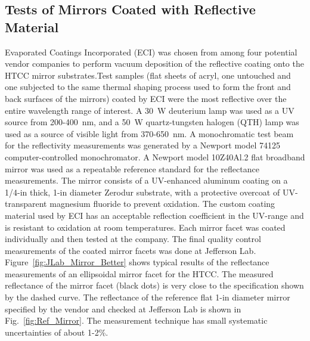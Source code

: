 \subsection{Tests of Mirrors Coated with Reflective Material}

Evaporated Coatings Incorporated (ECI) was chosen from among four potential vendor companies to perform
vacuum deposition of the reflective coating onto the HTCC mirror substrates.Test samples (flat sheets of acryl,
one untouched and one subjected to the same thermal shaping process used to form the front and back surfaces of
the mirrors) coated by ECI were the most reflective over the entire wavelength range of interest. A 30~W
deuterium lamp was used as a UV source from 200-400~nm, and a 50~W quartz-tungsten halogen (QTH) lamp was
used as a source of visible light from 370-650~nm. A monochromatic test beam for the reflectivity measurements
was generated by a Newport model 74125 computer-controlled monochromator. A Newport model 10Z40Al.2 flat
broadband mirror was used as a repeatable reference standard for the reflectance measurements. The mirror
consists of a UV-enhanced aluminum coating on a 1/4-in thick, 1-in diameter Zerodur substrate, with a protective
overcoat of UV-transparent magnesium fluoride to prevent oxidation. The custom coating material used by ECI has
an acceptable reflection coefficient in the UV-range and is resistant to oxidation at room temperatures. Each mirror
facet was coated individually and then tested at the company. The final quality control measurements of the coated
mirror facets was done at Jefferson Lab. Figure~\ref{fig:JLab_Mirror_Better} shows typical results of the
reflectance  measurements of an ellipsoidal mirror facet for the HTCC. The measured reflectance of the mirror
facet (black dots) is very close to the specification shown by the dashed curve. The reflectance of the reference
flat 1-in diameter mirror specified by the vendor and checked at Jefferson Lab is shown in Fig.~\ref{fig:Ref_Mirror}.
The measurement technique has small systematic uncertainties of about 1-2\%.

